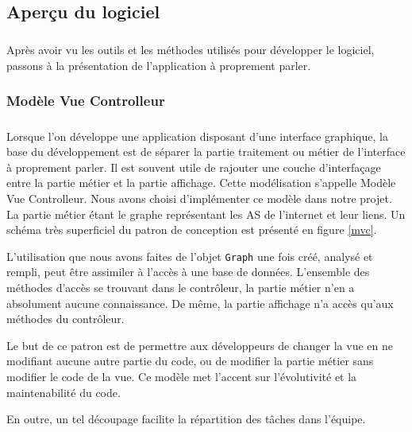 \subsection{Aperçu du logiciel}
\subparagraph{}
Après avoir vu les outils et les méthodes utilisés pour développer le logiciel, passons à la présentation de l'application à proprement parler.

\subsubsection{Modèle Vue Controlleur}
\label{mvcText}
\subparagraph{}
Lorsque l'on développe une application disposant d'une interface graphique, la base du développement est de séparer la partie traitement ou métier de l'interface à proprement parler. Il est souvent utile de rajouter une couche d'interfaçage entre la partie métier et la partie affichage. Cette modélisation s'appelle Modèle Vue Controlleur. Nous avons choisi d'implémenter ce modèle dans notre projet. La partie métier étant le graphe représentant les AS de l'internet et leur liens. Un schéma très superficiel du patron de conception est présenté en figure \ref{mvc}.

L'utilisation que nous avons faites de l'objet \verb|Graph| une fois créé, analysé et rempli, peut être assimiler à l'accès à une base de données. L'ensemble des méthodes d'accès se trouvant dans le contr\^oleur, la partie métier n'en a absolument aucune connaissance. De même, la partie affichage n'a accès qu'aux méthodes du contrôleur.

Le but de ce patron est de permettre aux développeurs de changer la vue en ne modifiant aucune autre partie du code, ou de modifier la partie métier sans modifier le code de la vue. Ce modèle met l'accent sur l'évolutivité et la maintenabilité du code. 

En outre, un tel découpage facilite la répartition des tâches dans l'équipe.

